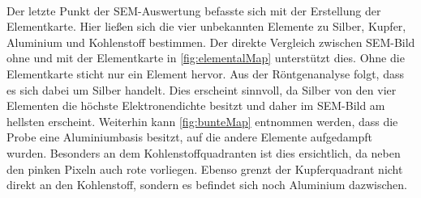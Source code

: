 	\

	Der letzte Punkt der SEM-Auswertung befasste sich mit der Erstellung der Elementkarte.
	Hier ließen sich die vier unbekannten Elemente zu Silber, Kupfer, Aluminium und Kohlenstoff bestimmen.
	Der direkte Vergleich zwischen SEM-Bild ohne und mit der Elementkarte in \cref{fig:elementalMap} unterstützt dies.
	Ohne die Elementkarte sticht nur ein Element hervor.
	Aus der Röntgenanalyse folgt, dass es sich dabei um Silber handelt.
	Dies erscheint sinnvoll, da Silber von den vier Elementen die höchste Elektronendichte besitzt und daher im SEM-Bild am hellsten erscheint.
	Weiterhin kann \cref{fig:bunteMap} entnommen werden, dass die Probe eine Aluminiumbasis besitzt, auf die andere Elemente aufgedampft wurden.
	Besonders an dem Kohlenstoffquadranten ist dies ersichtlich, da neben den pinken Pixeln auch rote vorliegen.
	Ebenso grenzt der Kupferquadrant nicht direkt an den Kohlenstoff, sondern es befindet sich noch Aluminium dazwischen.


